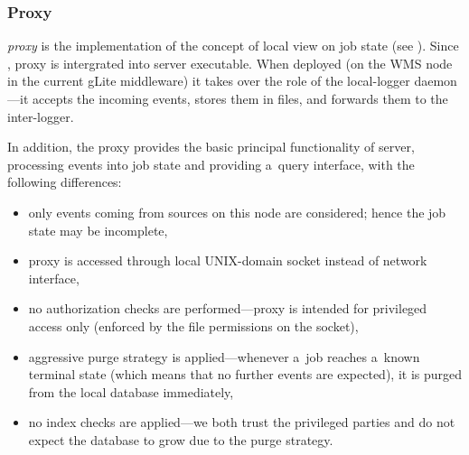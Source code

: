 
\subsubsection{Proxy}

\emph{\LB proxy} is the implementation of the concept of local view on job state (see
\ifx\insideUG{}\fi). Since
\LBnew, \LB proxy is intergrated into \LB server executable.  When deployed (on
the WMS node in the current gLite middleware) it takes over the role of the
local-logger daemon---it accepts the incoming events, stores them in files, and
forwards them to the inter-logger.

In addition, the proxy provides the basic principal functionality of \LB server,
\ie processing events into job state and providing a~query interface,
with the following differences:
\begin{itemize}
\item only events coming from sources on this node are considered; hence
the job state may be incomplete,
\item proxy is accessed through local UNIX-domain socket instead of network
interface,
\item no authorization checks are performed---proxy is intended for
privileged access only (enforced by the file permissions on the socket),
\item aggressive purge strategy is applied---whenever a~job reaches
a~known terminal state (which means that no further events are expected), it is purged
from the local database immediately,
\item no index checks are applied---we both trust the privileged parties
and do not expect the database to grow due to the purge strategy.
\end{itemize}

